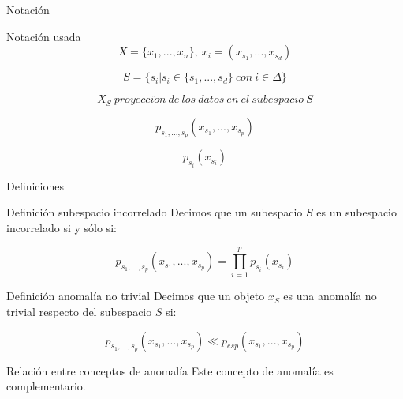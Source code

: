 \documentclass[10pt]{beamer}
\begin{document}
\begin{frame}[fragile]{Notación}
\vspace{10px}
\pause
{}

\begin{block}{Notación usada}
	$$X = \{ x_1 , ... , x_n \}, \ x_i = (x_{s_1} , ... , x_{s_d})$$
	
	\pause
	
	$$S = \{ s_i | s_i \in \{ s_1 , ... , s_d \} \ con \ i\in \Delta \}$$
	
	\pause
	
	$$X_S \ proyecci\acute{o}n \ de \ los \ datos \ en \ el \ subespacio \ S$$
	
	\pause
	
	$$p_{s_1 , ... , s_p}(x_{s_1} , ... , x_{s_p})$$
	
	\pause
	
	$$p_{s_i}(x_{s_i})$$
\end{block}

\end{frame}

\begin{frame}[fragile]{Definiciones}
\vspace{10px}
\pause
{}

\begin{block}{Definición subespacio incorrelado}
	Decimos que un subespacio $S$ es un subespacio incorrelado si y sólo si:
	
	$$p_{s_1 , ... , s_p}(x_{s_1} , ... , {x_{s_p}}) = \prod_{i=1}^{p}p_{s_i}(x_{s_i})$$
\end{block}

\pause

\begin{block}{Definición anomalía no trivial}
	Decimos que un objeto $x_S$ es una anomalía no trivial respecto del subespacio $S$ si:
	
	$$p_{s_1 , ... , s_p}(x_{s_1} , ... , x_{s_p})\ll p_{esp}(x_{s_1} , ... , x_{s_p})$$
\end{block}

\pause

\begin{alertblock}{Relación entre conceptos de anomalía}
	Este concepto de anomalía es complementario.
\end{alertblock}

\end{frame}
\end{document}

